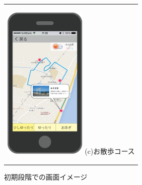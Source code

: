 \begin{figure}[htbp]
\begin{center}
\begin{tabular}{c}
      \begin{minipage}{0.33\hsize}
        \begin{center}
\includegraphics[width=4cm, bb=0 0 302 572]{5.2_sanpo.png}
          \hspace{1cm} (c)お散歩コース
        \end{center}
      \end{minipage}

    \end{tabular}
    \caption{初期段階での画面イメージ}
    \label{fig:lena}
  \end{center}
\end{figure}

